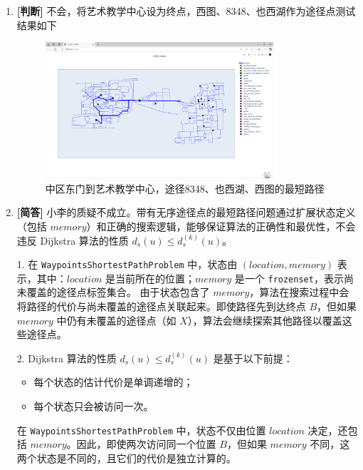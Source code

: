\documentclass{article}
\begin{document}
\begin{enumerate}[label=(\alph*), start=3]

    \item \textbf{[判断]} %
    不会，将艺术教学中心设为终点，西图、8348、也西湖作为途径点测试结果如下
    \FloatBarrier
    \begin{figure}[h]
    	\centering
    	\includegraphics[width=0.8\textwidth]{test_for_duplicate_points.png}
    	\caption{中区东门到艺术教学中心，途径8348、也西湖、西图的最短路径}
    \end{figure}
    \item \textbf{[简答]} %
    小李的质疑不成立。带有无序途径点的最短路径问题通过扩展状态定义（包括 \( memory \)）和正确的搜索逻辑，能够保证算法的正确性和最优性，不会违反 Dijkstra 算法的性质 \( d_s(u) \leq d_s^{(k)}(u) \)。
    
    1. 在 \texttt{WaypointsShortestPathProblem} 中，状态由 \( (location, memory) \) 表示，其中：\( location \) 是当前所在的位置；\( memory \) 是一个 \texttt{frozenset}，表示尚未覆盖的途径点标签集合。
    由于状态包含了 \( memory \)，算法在搜索过程中会将路径的代价与尚未覆盖的途径点关联起来。即使路径先到达终点 \( B \)，但如果 \( memory \) 中仍有未覆盖的途径点（如 \( X \)），算法会继续探索其他路径以覆盖这些途径点。
    
    2.  Dijkstra 算法的性质 \( d_s(u) \leq d_s^{(k)}(u) \) 是基于以下前提：
    \begin{itemize}
    	\item 每个状态的估计代价是单调递增的；
    	\item 每个状态只会被访问一次。
    \end{itemize}
    
    在 \texttt{WaypointsShortestPathProblem} 中，状态不仅由位置 \( location \) 决定，还包括 \( memory \)。因此，即使两次访问同一个位置 \( B \)，但如果 \( memory \) 不同，这两个状态是不同的，且它们的代价是独立计算的。
    

\end{enumerate}
\end{document}
